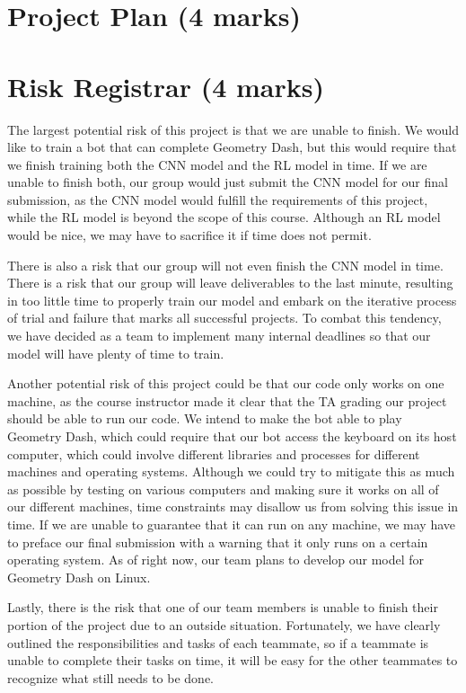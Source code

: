 \documentclass{article} %
\begin{document}
\section{Project Plan (4 marks)}



\section{Risk Registrar (4 marks)}
The largest potential risk of this project is that we are unable to 
finish. We would like to train a bot that can complete Geometry Dash, 
but this would require that we finish training both the CNN model and 
the RL model in time. If we are unable to finish both, our group would 
just submit the CNN model for our final submission, as the CNN model 
would fulfill the requirements of this project, while the RL model is 
beyond the scope of this course. Although an RL model would be nice, 
we may have to sacrifice it if time does not permit. 

There is also a risk that our group will not even finish the CNN model 
in time. There is a risk that our group will leave deliverables to the 
last minute, resulting in too little time to properly train our model 
and embark on the iterative process of trial and failure that marks all
successful projects. To combat this tendency, we have decided as a team 
to implement many internal deadlines so that our model will have plenty 
of time to train.

Another potential risk of this project could be that our code only works
on one machine, as the course instructor made it clear that the TA grading
our project should be able to run our code. We intend to make the bot 
able to play Geometry Dash, which could require that our bot access the 
keyboard on its host computer, which could involve different libraries 
and processes for different machines and operating systems. Although 
we could try to mitigate this as much as possible by testing on various 
computers and making sure it works on all of our different machines, time
constraints may disallow us from solving this issue in time. If we are 
unable to guarantee that it can run on any machine, we may have to preface 
our final submission with a warning that it only runs on a certain 
operating system. As of right now, our team plans to develop our model 
for Geometry Dash on Linux. 

Lastly, there is the risk that one of our team members is unable to finish
their portion of the project due to an outside situation. Fortunately, 
we have clearly outlined the responsibilities and tasks of each teammate, 
so if a teammate is unable to complete their tasks on time, it will be 
easy for the other teammates to recognize what still needs to be done.
\end{document}
